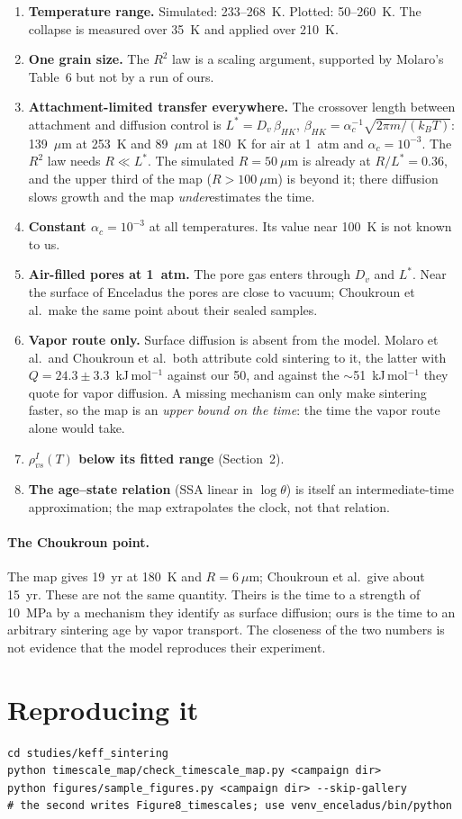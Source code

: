 \documentclass[11pt]{article}
\newcommand{\rvs}{\rho_{vs}^{I}}
\begin{document}
\begin{enumerate}
\item \textbf{Temperature range.} Simulated: 233--268~K. Plotted: 50--260~K.
  The collapse is measured over 35~K and applied over 210~K.
\item \textbf{One grain size.} The $R^{2}$ law is a scaling argument,
  supported by Molaro's Table~6 but not by a run of ours.
\item \textbf{Attachment-limited transfer everywhere.} The crossover length
  between attachment and diffusion control is $L^{*} = D_v\,\beta_{HK}$,
  $\beta_{HK} = \alpha_c^{-1}\sqrt{2\pi m/(k_B T)}$: 139~$\mu$m at 253~K and
  89~$\mu$m at 180~K for air at 1~atm and $\alpha_c = 10^{-3}$. The $R^{2}$ law
  needs $R \ll L^{*}$. The simulated $R = 50~\mu$m is already at $R/L^{*} =
  0.36$, and the upper third of the map ($R > 100~\mu$m) is beyond it; there
  diffusion slows growth and the map \emph{under}estimates the time.
\item \textbf{Constant $\alpha_c = 10^{-3}$} at all temperatures. Its value
  near 100~K is not known to us.
\item \textbf{Air-filled pores at 1~atm.} The pore gas enters through $D_v$
  and $L^{*}$. Near the surface of Enceladus the pores are close to vacuum;
  Choukroun et al.\ make the same point about their sealed samples.
\item \textbf{Vapor route only.} Surface diffusion is absent from the model.
  Molaro et al.\ and Choukroun et al.\ both attribute cold sintering to it,
  the latter with $Q = 24.3 \pm 3.3$~kJ\,mol$^{-1}$ against our 50, and
  against the $\sim$51~kJ\,mol$^{-1}$ they quote for vapor diffusion. A
  missing mechanism can only make sintering faster, so the map is an
  \emph{upper bound on the time}: the time the vapor route alone would take.
\item \textbf{$\rvs(T)$ below its fitted range} (Section~2).
\item \textbf{The age--state relation} (SSA linear in $\log\theta$) is itself
  an intermediate-time approximation; the map extrapolates the clock, not
  that relation.
\end{enumerate}

\paragraph{The Choukroun point.} The map gives 19~yr at 180~K and
$R = 6~\mu$m; Choukroun et al.\ give about 15~yr. These are not the same
quantity. Theirs is the time to a strength of 10~MPa by a mechanism they
identify as surface diffusion; ours is the time to an arbitrary sintering age
by vapor transport. The closeness of the two numbers is not evidence that the
model reproduces their experiment.

\section{Reproducing it}

\begin{verbatim}
cd studies/keff_sintering
python timescale_map/check_timescale_map.py <campaign dir>
python figures/sample_figures.py <campaign dir> --skip-gallery
# the second writes Figure8_timescales; use venv_enceladus/bin/python
\end{verbatim}
\end{document}
